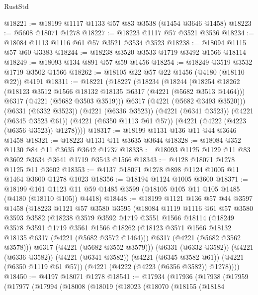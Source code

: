 \begin{lexlean}{RustStd}
\begin{coremodule}
{\begin{coremodule}
{{{{{{{{{{{{{{{{{{{{{{{{{{{{{{{@18221 := @18199 @1117 @1133 @57 @83 @3538 (@1454 @3646 @1458)
@18223 := @5608 @18071 @1278
@18227 := @18223 @1117 @57 @3521 @3536
@18234 := @18084 @1113 @1116 @61 @57 @3521 @3534 @3523
@18238 := @18094 @1115 @57 @60 @3383
@18244 := @18238 @3520 @3533 @1719 @3492 @1566 @18114
@18249 := @18093 @134 @891 @57 @59 @1456
@18254 := @18249 @3519 @3532 @1719 @3502 @1566
@18262 := @18105 @22 @57 @22 @1456 (@4180 (@18110 @22)) @4191
@18311 := @18221
    (@18227
      (@18234
        (@18244
          (@18254
            @18262
            (@18123 @3512 @1566 @18132 @18135 @6317 (@4221 (@5682 @3513 @1464)))
            @6317
            (@4221 (@5682 @3503 @3519)))
          @6317
          (@4221 (@5682 @3493 @3520)))
        (@6331 (@6332 @3523))
        (@4221 (@6336 @3523))
        (@4221 (@6341 @3523))
        (@4221 (@6345 @3523 @61))
        (@4221 (@6350 @1113 @61 @57))
        (@4221 (@4222 (@4223 (@6356 @3523)) @1278))))
@18317 := @18199 @1131 @136 @11 @44 @3646 @1458
@18321 := @18223 @1131 @11 @3635 @3644
@18328 := @18084 @352 @1130 @84 @11 @3635 @3642 @1737
@18338 := @18093 @1125 @1129 @11 @83 @3602 @3634 @3641 @1719 @3543 @1566
@18343 := @4128 @18071 @1278 @1125 @11 @3602
@18353 := @4137 @18071 @1278 @898 @1124 @1005 @11 @1464 @3600 @1278 @1023
@18356 := @18194 @1124 @1005 @3600
@18371 := @18199
    @161
    @1123
    @11
    @59
    @1485
    @3599
    (@18105 @105 @11 @105 @1485 (@4180 (@18110 @105)) @4418)
@18448 := @18199
    @1121
    @136
    @57
    @44
    @3597
    @1458
    (@18223
      @1121
      @57
      @3580
      @3595
      (@18084
        @1119
        @1116
        @61
        @57
        @3580
        @3593
        @3582
        (@18238
          @3579
          @3592
          @1719
          @3551
          @1566
          @18114
          (@18249
            @3578
            @3591
            @1719
            @3561
            @1566
            @18262
            (@18123 @3571 @1566 @18132 @18135 @6317 (@4221 (@5682 @3572 @1464)))
            @6317
            (@4221 (@5682 @3562 @3578)))
          @6317
          (@4221 (@5682 @3552 @3579)))
        (@6331 (@6332 @3582))
        (@4221 (@6336 @3582))
        (@4221 (@6341 @3582))
        (@4221 (@6345 @3582 @61))
        (@4221 (@6350 @1119 @61 @57))
        (@4221 (@4222 (@4223 (@6356 @3582)) @1278))))
@18450 := @4197 @18071 @1278
@18541 := @17934
    (@17936
      (@17938
        (@17959
          (@17977
            (@17994
              (@18008
                (@18019
                  (@18023
                    (@18070
                      (@18155
                        (@18184
}}}}}}}}}}}}}}}}}}}}}}}}}}}}}}}
\end{coremodule}}
\end{coremodule}
\end{lexlean}
